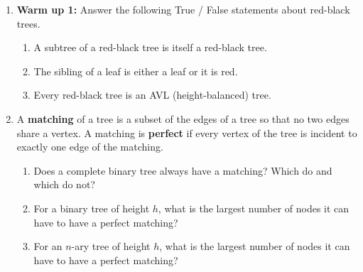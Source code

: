 \documentclass[a4paper,12pt]{article}
\begin{document}
\begin{enumerate}

\item \textbf{Warm up 1:} Answer the following True / False statements about red-black trees.
\begin{enumerate}
\item A subtree of a red-black tree is itself a red-black tree.
\item The sibling of a leaf is either a leaf or it is red.
\item Every red-black tree is an AVL (height-balanced) tree.
\end{enumerate}

\vfill
\item A \textbf{matching} of a tree is a subset of the edges of a tree so that no two edges share a vertex. A matching is \textbf{perfect} if every vertex of the tree is incident to exactly one edge of the matching.
\begin{enumerate}
\item Does a complete binary tree always have a matching? Which do and which do not?
\item For a binary tree of height $h$, what is the largest number of nodes it can have to have a perfect matching?
\item For an $n$-ary tree of height $h$, what is the largest number of nodes it can have to have a perfect matching?
\end{enumerate}


\end{enumerate}
\end{document}
